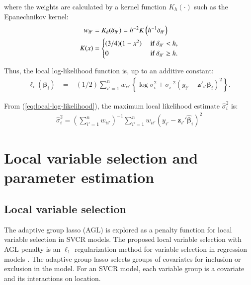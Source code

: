 \documentclass[authoryear, review, 11pt]{elsarticle}
\begin{document}
  where the weights are calculated by a kernel function $K_h(\cdot)$ such as the Epanechnikov kernel:
  \begin{align}\label{eq:epanechnikov}
	  w_{ii'} &= K_h(\delta_{ii'}) = h^{-2} K\left( h^{-1} \delta_{ii'} \right) \notag \\
    K(x) &= \begin{cases} (3/4) (1-x^2) &\mbox{ if } \delta_{ii'} < h, \\ 0 &\mbox{ if } \delta_{ii'} \geq h. \end{cases}
	\end{align}
  
  Thus, the local log-likelihood function is, up to an additive constant: 
  \begin{align}\label{eq:local-log-likelihood}
		\ell_i\left(\bm{\beta}_i\right) &= -(1/2) \sum_{i'=1}^n w_{ii'} \left\{ \log{\sigma^2_i}  + \sigma^{-2}_i  \left(y_{i'} - \bm{z}'_{i'} \bm{\beta}_i \right)^2 \right\}.
	\end{align}
	

	
	 From (\ref{eq:local-log-likelihood}), the maximum local likelihood estimate $\hat{\sigma}_i^2$ is:	 
	 \begin{align}
	 	\hat{\sigma}_i^2 = \left(\sum \limits_{i'=1}^{n} w_{ii'} \right)^{-1} \sum \limits_{i'=1}^n w_{ii'}\left(y_{i'} - \bm{z}_{i'}'\hat{\bm{\beta}}_i\right)^2
	\end{align}
	 

\section{Local variable selection and parameter estimation \label{section:model-selection}}
	\subsection{Local variable selection}
	The adaptive group lasso (AGL) is explored as a penalty function for local variable selection in SVCR models. The proposed local variable selection with AGL penalty is an $\ell_1$ regularization method for variable selection in regression models \citep{Wang-Leng-2008,Zou:2006}. The adaptive group lasso selects groups of covariates for inclusion or exclusion in the model. For an SVCR model, each variable group is a covariate and its interactions on location.
	
\end{document}
